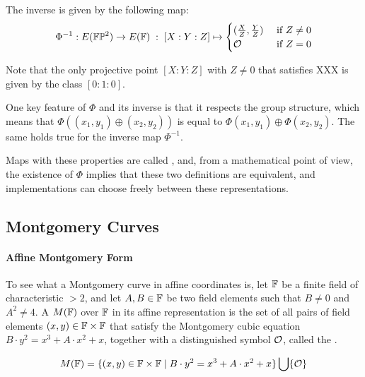 The inverse is given by the following map:
\begin{equation}
\Phi^{-1} : E(\mathbb{F}\mathbb{P}^2)\to E(\mathbb{F}) \;:\; [X:Y:Z] \mapsto \begin{cases}
(\frac{X}{Z},\frac{Y}{Z}) & \text{ if } Z\neq 0\\
\mathcal{O} & \text{ if } Z=0
\end{cases}
\end{equation}

Note that the only projective point $[X:Y:Z]$ with $Z\neq 0$ that satisfies XXX is given by the class $[0:1:0]$. 

One key feature of $\Phi$ and its inverse is that it respects the group structure, which means that $\Phi((x_1,y_1)\oplus (x_2,y_2))$ is equal to $\Phi(x_1,y_1)\oplus \Phi(x_2,y_2)$. The same holds true for the inverse map $\Phi^{-1}$.

Maps with these properties are called , and, from a mathematical point of view, the existence of $\Phi$ implies that these two definitions are equivalent, and implementations can choose freely between these representations. 


\subsection{Montgomery Curves}\label{sec:montgomery}

\paragraph{Affine Montgomery Form}
To see what a Montgomery curve in affine coordinates is, let $\mathbb{F}$ be a finite field of characteristic $>2$, and let $A,B\in \mathbb{F}$ be two field elements such that $B\neq 0$ and $A^2 \neq 4$.  A  $M(\mathbb{F})$ over $\mathbb{F}$ in its affine representation is the set of all pairs of field elements $(x,y)\in \mathbb{F}\times \mathbb{F}$ that satisfy the Montgomery cubic equation $B\cdot y^2 = x^3 + A\cdot x^2 + x$, together with a distinguished symbol $\mathcal{O}$, called the .

\begin{equation}\label{eq:montgomery-curve}M(\mathbb{F}) = \{(x,y)\in \mathbb{F}\times \mathbb{F}\;|\; B\cdot y^2 = x^3 + A\cdot x^2 + x  \} \bigcup \{\mathcal{O}\}
\end{equation}

